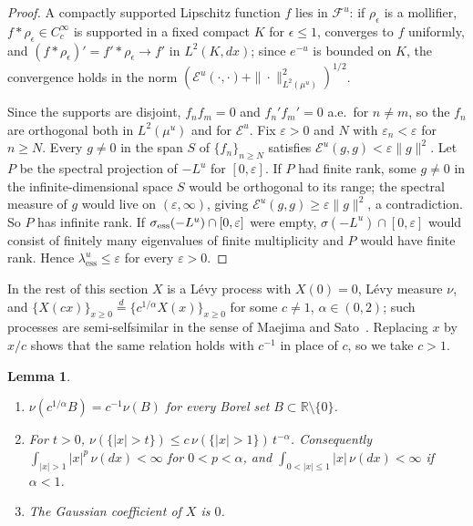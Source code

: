 \documentclass[11pt]{amsart}
\newtheorem{lemma}[theorem]{Lemma}
\theoremstyle{remark}
\newcommand{\R}{\mathbb R}
\newcommand{\cE}{\mathcal E}
\newcommand{\cF}{\mathcal F}
\newcommand{\essbot}{\lambda_{\mathrm{ess}}}
\begin{document}
\begin{proof}
A compactly supported Lipschitz function $f$ lies in $\cF^u$: if $\rho_\epsilon$ is a mollifier, $f*\rho_\epsilon\in C_c^\infty$ is supported in a fixed compact $K$ for $\epsilon\le1$, converges to $f$ uniformly, and $(f*\rho_\epsilon)'=f'*\rho_\epsilon\to f'$ in $L^2(K,dx)$; since $e^{-u}$ is bounded on $K$, the convergence holds in the norm $(\cE^u(\cdot,\cdot)+\|\cdot\|^2_{L^2(\mu^u)})^{1/2}$.

Since the supports are disjoint, $f_nf_m=0$ and $f_n'f_m'=0$ a.e.\ for $n\ne m$, so the $f_n$ are orthogonal both in $L^2(\mu^u)$ and for $\cE^u$. Fix $\varepsilon>0$ and $N$ with $\varepsilon_n<\varepsilon$ for $n\ge N$. Every $g\ne0$ in the span $S$ of $\{f_n\}_{n\ge N}$ satisfies $\cE^u(g,g)<\varepsilon\|g\|^2$. Let $P$ be the spectral projection of $-L^u$ for $[0,\varepsilon]$. If $P$ had finite rank, some $g\ne0$ in the infinite-dimensional space $S$ would be orthogonal to its range; the spectral measure of $g$ would live on $(\varepsilon,\infty)$, giving $\cE^u(g,g)\ge\varepsilon\|g\|^2$, a contradiction. So $P$ has infinite rank. If $\sigma_{\rm ess}(-L^u)\cap[0,\varepsilon]$ were empty, $\sigma(-L^u)\cap[0,\varepsilon]$ would consist of finitely many eigenvalues of finite multiplicity and $P$ would have finite rank. Hence $\essbot^u\le\varepsilon$ for every $\varepsilon>0$.
\end{proof}

In the rest of this section $X$ is a L\'evy process with $X(0)=0$, L\'evy measure $\nu$, and $\{X(cx)\}_{x\ge0}\overset d=\{c^{1/\alpha}X(x)\}_{x\ge0}$ for some $c\ne1$, $\alpha\in(0,2)$; such processes are semi-selfsimilar in the sense of Maejima and Sato~\cite{MS}. Replacing $x$ by $x/c$ shows that the same relation holds with $c^{-1}$ in place of $c$, so we take $c>1$.

\begin{lemma}\label{lem:nu}
\begin{enumerate}[label=\textup{(\alph*)}]
\item $\nu(c^{1/\alpha}B)=c^{-1}\nu(B)$ for every Borel set $B\subset\R\setminus\{0\}$.
\item For $t>0$, $\nu(\{|x|>t\})\le c\,\nu(\{|x|>1\})\,t^{-\alpha}$. Consequently $\int_{|x|>1}|x|^p\,\nu(dx)<\infty$ for $0<p<\alpha$, and $\int_{0<|x|\le1}|x|\,\nu(dx)<\infty$ if $\alpha<1$.
\item The Gaussian coefficient of $X$ is $0$.
\end{enumerate}
\end{lemma}
\end{document}
